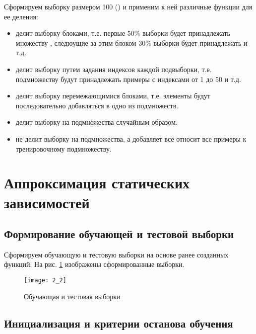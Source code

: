 Сформируем выборку размером 100 () и применим к ней различные функции для ее деления:
\begin{itemize}
	\item {} делит выборку блоками, т.е. первые 50\% выборки будет принадлежать множеству , следюущие за этим блоком 30\% выборки будет принадлежать  и т.д.
	\item {} делит выборку путем задания индексов каждой подвыборки, т.е. подмножеству  будут принадлежать примеры с индексами от 1 до 50 и т.д.
	\item {} делит выборку перемежающимися блоками, т.е. элементы будут последовательно добавляться в одно из подмножеств.
	\item {} делит выборку на подмножества случайным образом.
	\item {} не делит выборку на подмножества, а добавляет все относит все примеры к тренировочному подмножеству.
\end{itemize}

\section{Аппроксимация статических зависимостей}

\subsection{Формирование обучающей и тестовой выборки}

Сформируем обучающую и тестовую выборки на основе ранее созданных функций. На рис. \ref{fig:2_2} изображены сформированные выборки.
\begin{figure}[H]
\begin{center}
	\texttt{[image: 2\_2]}
	\caption{Обучающая и тестовая выборки}
	\label{fig:2_2}
\end{center}
\end{figure}

\subsection{Инициализация и критерии останова обучения}

